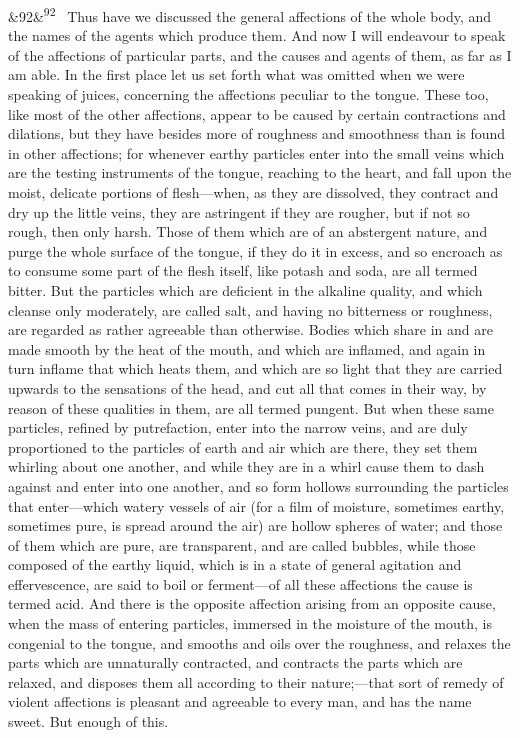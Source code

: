 \documentclass[12pt]{article}
\newcommand{\para}[1][]{\par\noindent\ifx&#1&\else\textsuperscript{\footnotesize #1}~\fi}
\begin{document}
\para[92] Thus have we discussed the general affections of the whole body, and the names of the agents which produce them. And now I will endeavour to speak of the affections of particular parts, and the causes and agents of them, as far as I am able. In the first place let us set forth what was omitted when we were speaking of juices, concerning the affections peculiar to the tongue. These too, like most of the other affections, appear to be caused by certain contractions and dilations, but they have besides more of roughness and smoothness than is found in other affections; for whenever earthy particles enter into the small veins which are the testing instruments of the tongue, reaching to the heart, and fall upon the moist, delicate portions of flesh---when, as they are dissolved, they contract and dry up the little veins, they are astringent if they are rougher, but if not so rough, then only harsh. Those of them which are of an abstergent nature, and purge the whole surface of the tongue, if they do it in excess, and so encroach as to consume some part of the flesh itself, like potash and soda, are all termed bitter. But the particles which are deficient in the alkaline quality, and which cleanse only moderately, are called salt, and having no bitterness or roughness, are regarded as rather agreeable than otherwise. Bodies which share in and are made smooth by the heat of the mouth, and which are inflamed, and again in turn inflame that which heats them, and which are so light that they are carried upwards to the sensations of the head, and cut all that comes in their way, by reason of these qualities in them, are all termed pungent. But when these same particles, refined by putrefaction, enter into the narrow veins, and are duly proportioned to the particles of earth and air which are there, they set them whirling about one another, and while they are in a whirl cause them to dash against and enter into one another, and so form hollows surrounding the particles that enter---which watery vessels of air (for a film of moisture, sometimes earthy, sometimes pure, is spread around the air) are hollow spheres of water; and those of them which are pure, are transparent, and are called bubbles, while those composed of the earthy liquid, which is in a state of general agitation and effervescence, are said to boil or ferment---of all these affections the cause is termed acid. And there is the opposite affection arising from an opposite cause, when the mass of entering particles, immersed in the moisture of the mouth, is congenial to the tongue, and smooths and oils over the roughness, and relaxes the parts which are unnaturally contracted, and contracts the parts which are relaxed, and disposes them all according to their nature;---that sort of remedy of violent affections is pleasant and agreeable to every man, and has the name sweet. But enough of this.
\end{document}

